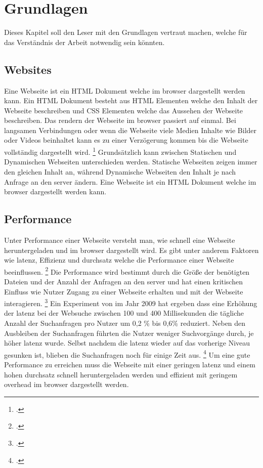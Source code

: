 \section{Grundlagen}
Dieses Kapitel soll den Leser mit den Grundlagen vertraut machen, welche für das Verständnis der Arbeit notwendig sein könnten.


\subsection{Websites}
Eine Webseite ist ein \ac{HTML} Dokument welche im \gls{browser} dargestellt werden kann.
Ein \ac{HTML} Dokument besteht aus \ac{HTML} Elementen welche den Inhalt der Webseite beschreiben und \ac{CSS} Elementen welche das Aussehen der Webseite beschreiben.
Das rendern der Webseite im \gls{browser} passiert auf einmal. Bei langsamen Verbindungen oder wenn die Webseite viele Medien Inhalte wie Bilder oder Videos beinhaltet kann es zu einer Verzögerung kommen bis die Webseite vollständig dargestellt wird. \footcite[Vgl.][Seite 27 - 31]{Robbins2018}
Grundsätzlich kann zwischen Statischen und Dynamischen Webseiten unterschieden werden.
Statische Webseiten zeigen immer den gleichen Inhalt an, während Dynamische Webseiten den Inhalt je nach Anfrage an den \gls{server} ändern.
\newline
Eine Webseite ist ein \ac{HTML} Dokument welche im \gls{browser} dargestellt werden kann.

\subsection{Performance}
Unter Performance einer Webseite versteht man, wie schnell eine Webseite heruntergeladen und im \gls{browser} dargestellt wird.
Es gibt unter anderem Faktoren wie \gls{latenz}, Effizienz und \gls{durchsatz} welche die Performance einer Webseite beeinflussen. \footcite[Vgl.][Seite 53]{Killelea2002}
Die Performance wird bestimmt durch die Größe der benötigten Dateien und der Anzahl der Anfragen an den \gls{server}
und hat einen kritischen Einfluss wie Nutzer Zugang zu einer Webseite erhalten und mit der Webseite interagieren. \footcite[Vgl.][Seite 44]{Robbins2018}
Ein Experiment von  im Jahr 2009 hat ergeben dass eine Erhöhung der \gls{latenz} bei der Websuche zwischen 100 und 400 Millisekunden die tägliche
Anzahl der Suchanfragen pro Nutzer um 0,2 \% bis 0,6\% reduziert.
Neben den Ausbleiben der Suchanfragen führten die Nutzer weniger Suchvorgänge durch, je höher \gls{latenz} wurde.
Selbst nachdem die \gls{latenz} wieder auf das vorherige Niveau gesunken ist, blieben die Suchanfragen noch für einige Zeit aus. \footcite[Vgl.][Seite 1]{Google2009}
\newline
Um eine gute Performance zu erreichen muss die Webseite mit einer geringen \gls{latenz} und einem hohen \gls{durchsatz} schnell heruntergeladen werden
und effizient mit geringem \gls{overhead} im \gls{browser} dargestellt werden.

